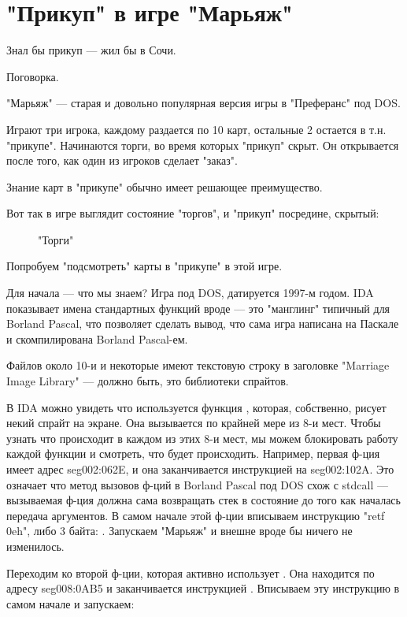 \section{"Прикуп" в игре "Марьяж"}

\epigraph{Знал бы прикуп --- жил бы в Сочи.}{Поговорка.}

"Марьяж" --- старая и довольно популярная версия игры в "Преферанс" под DOS.

Играют три игрока, каждому раздается по 10 карт, остальные 2 остается в т.н. "прикупе".
Начинаются торги, во время которых "прикуп" скрыт.
Он открывается после того, как один из игроков сделает "заказ".

Знание карт в "прикупе" обычно имеет решающее преимущество.

Вот так в игре выглядит состояние "торгов", и "прикуп" посредине, скрытый:

\begin{figure}[H]
\centering
{}
\caption{"Торги"}
\end{figure}

Попробуем "подсмотреть" карты в "прикупе" в этой игре.

Для начала --- что мы знаем?
Игра под DOS, датируется 1997-м годом. IDA показывает имена стандартных функций вроде 
 --- это "манглинг" типичный для Borland Pascal, что позволяет сделать вывод,
что сама игра написана на Паскале и скомпилирована Borland Pascal-ем.

Файлов около 10-и и некоторые имеют текстовую строку в заголовке "Marriage Image Library" --- должно быть,
это библиотеки спрайтов.

В IDA можно увидеть что используется функция , которая, собственно,
рисует некий спрайт на экране.
Она вызывается по крайней мере из 8-и мест.
Чтобы узнать что происходит в каждом из этих 8-и мест, мы можем блокировать работу каждой функции и смотреть,
что будет происходить.
Например, первая ф-ция имеет адрес seg002:062E, и она заканчивается инструкцией  на seg002:102A.
Это означает что метод вызовов ф-ций в Borland Pascal под DOS схож с stdcall --- вызываемая ф-ция должна сама
возвращать стек в состояние до того как началась передача аргументов.
В самом начале этой ф-ции вписываем инструкцию "retf 0eh", либо 3 байта: .
Запускаем "Марьяж" и внешне вроде бы ничего не изменилось.

Переходим ко второй ф-ции, которая активно использует .
Она находится по адресу seg008:0AB5 и заканчивается инструкцией .
Вписываем эту инструкцию в самом начале и запускаем:

